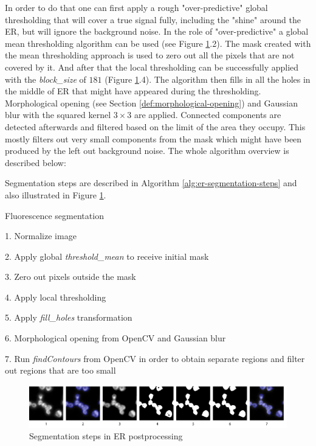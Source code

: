 In order to do that one can first apply a rough "over-predictive" global thresholding that will cover a true signal fully, including the "shine" around the ER, but will ignore the background noise. In the role of "over-predictive" a global mean thresholding algorithm can be used (see Figure \ref{fig:er-segmentation-steps}.2). The mask created with the mean thresholding approach is used to zero out all the pixels that are not covered by it. And after that the local thresholding can be successfully applied with the \textit{block\_size} of $181$ (Figure \ref{fig:er-segmentation-steps}.4). The algorithm then fills in all the holes in the middle of ER that might have appeared during the thresholding. Morphological opening (see Section \ref{def:morphological-opening}) and Gaussian blur with the squared kernel $3 \times 3$ are applied. Connected components are detected afterwards and filtered based on the limit of the area they occupy. This mostly filters out very small components from the mask which might have been produced by the left out background noise. The whole algorithm overview is described below:

Segmentation steps are described in Algorithm \ref{alg:er-segmentation-steps} and also illustrated in Figure \ref{fig:er-segmentation-steps}.

\begin{algorithm}
    \caption{Fluorescence segmentation}
    \begin{algorithmic}
    \item 1. Normalize image
    \item 2. Apply global \textit{threshold\_mean} to receive initial mask
    \item 3. Zero out pixels outside the mask
    \item 4. Apply local thresholding
    \item 5. Apply \textit{fill\_holes} transformation
    \item 6. Morphological opening from OpenCV and Gaussian blur
    \item 7. Run \textit{findContours} from OpenCV in order to obtain separate regions and filter out regions that are too small
    \end{algorithmic}
    \label{alg:er-segmentation-steps}
\end{algorithm}    

\begin{figure}[htb]
    \begin{center}
        \includegraphics[width=\linewidth]{bilder/ER/segmentation/segmentation.png}
        \caption{Segmentation steps in ER postprocessing}\label{fig:er-segmentation-steps}
    \end{center}
\end{figure}